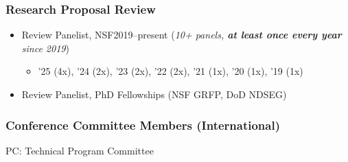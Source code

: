 \documentclass[11pt]{article}
\begin{document}
\subsubsection{Research Proposal Review}
\begin{itemize}
    \item Review Panelist, NSF\hfill 2019--present (\emph{10+ panels, \textbf{at least once every year} since 2019})
    \begin{itemize}
    \item '25 (4x), '24 (2x), '23 (2x), '22 (2x), '21 (1x), '20 (1x), '19 (1x) 
    \end{itemize}
  \item Review Panelist, PhD Fellowships (NSF GRFP, DoD NDSEG)
\end{itemize}

\subsubsection{Conference Committee Members (International)}

\begin{description}[before=\small]
    \item PC: Technical Program Committee
\end{description}
\end{document}
